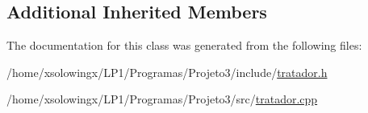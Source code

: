 \subsection*{Additional Inherited Members}


The documentation for this class was generated from the following files\+:\begin{DoxyCompactItemize}
\item 
/home/xsolowingx/\+L\+P1/\+Programas/\+Projeto3/include/\hyperlink{tratador_8h}{tratador.\+h}\item 
/home/xsolowingx/\+L\+P1/\+Programas/\+Projeto3/src/\hyperlink{tratador_8cpp}{tratador.\+cpp}\end{DoxyCompactItemize}
